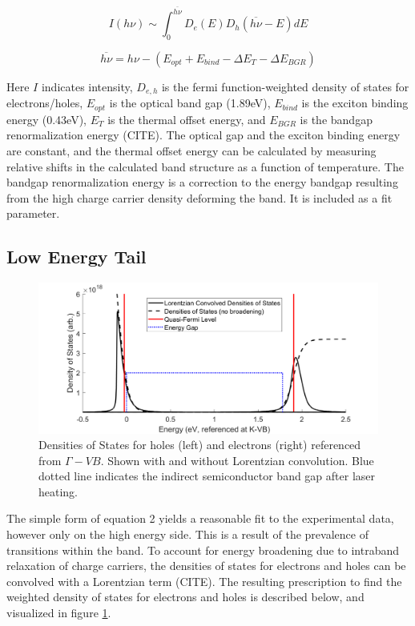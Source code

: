 \documentclass[aps,prb,preprint,groupedaddress]{revtex4-2}
\begin{document}
\begin{equation} \label{PL Intensity}
I(h\nu) \sim \int_0^{\overline{h\nu}} D_e(E) D_h(\overline{h\nu} - E) dE
\end{equation}

\begin{equation} \label{Energy Offset}
\overline{h\nu} = h\nu - (E_{opt} + E_{bind} - \Delta E_T - \Delta E_{BGR})
\end{equation}

Here $I$ indicates intensity, $D_{e,h}$ is the fermi function-weighted density of states for electrons/holes, $E_{opt}$ is the optical band gap (1.89eV), $E_{bind}$ is the exciton binding energy (0.43eV), $E_T$ is the thermal offset energy, and $E_{BGR}$ is the bandgap renormalization energy (CITE). The optical gap and the exciton binding energy are constant, and the thermal offset energy can be calculated by measuring relative shifts in the calculated band structure as a function of temperature. The bandgap renormalization energy is a correction to the energy bandgap resulting from the high charge carrier density deforming the band. It is included as a fit parameter.


\subsection{Low Energy Tail}

\begin{figure}
	\includegraphics[width=1\linewidth]{fig_DOS.png}
	\caption{Densities of States for holes (left) and electrons (right) referenced from $\Gamma-VB$. Shown with and without Lorentzian convolution. Blue dotted line indicates the indirect semiconductor band gap after laser heating.}
	\label{fig:DOS}
\end{figure}

The simple form of equation 2 yields a reasonable fit to the experimental data, however only on the high energy side. This is a result of the prevalence of transitions within the band. To account for energy broadening due to intraband relaxation of charge carriers, the densities of states for electrons and holes can be convolved with a Lorentzian term (CITE). The resulting prescription to find the weighted density of states for electrons and holes is described below, and visualized in figure \ref{fig:DOS}.
\end{document}
